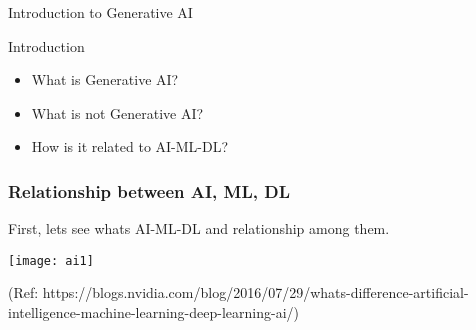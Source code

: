 \begin{frame}[fragile]\frametitle{}
\begin{center}
{\Large Introduction to Generative AI}
\end{center}
\end{frame}

\begin{frame}[fragile]{Introduction}
\begin{itemize}
\item What is Generative AI?
\item What is not Generative AI?
\item How is it related to AI-ML-DL?
\end{itemize}
\end{frame}

\begin{frame}[fragile]\frametitle{Relationship between AI, ML, DL}

First, lets see whats AI-ML-DL and relationship among them.

\begin{center}
\texttt{[image: ai1]}
\end{center}

{\tiny (Ref: https://blogs.nvidia.com/blog/2016/07/29/whats-difference-artificial-intelligence-machine-learning-deep-learning-ai/)}

\end{frame}





